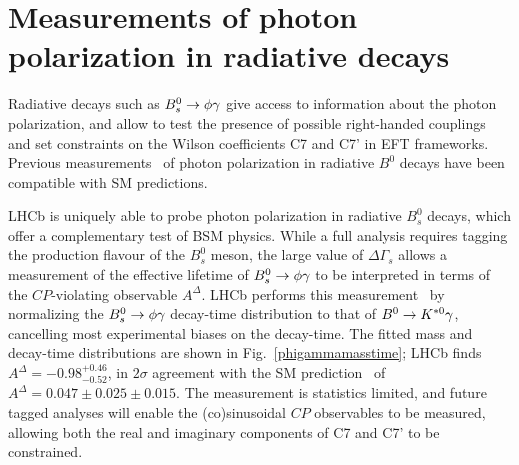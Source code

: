 \section{Measurements of photon polarization in radiative decays}
\label{sec:photpol}
Radiative decays such as ${B}^0_s \rightarrow \phi \gamma$ give access to information
about the photon polarization, and allow to test the presence of possible right-handed
couplings and set constraints on the Wilson coefficients C7 and C7' in EFT frameworks.
Previous measurements~\cite{} of photon polarization in radiative $B^0$ decays
have been compatible with SM predictions. 

LHCb is uniquely able to probe photon polarization in radiative $B^0_s$ decays,
which offer a complementary test of BSM physics. While a full analysis requires
tagging the production flavour of the $B^0_s$ meson, the large value of $\Delta\Gamma_s$
allows a measurement of the effective lifetime of ${B}^0_s \rightarrow \phi \gamma$ to be
interpreted in terms of the $CP$-violating observable $A^\Delta$. LHCb
performs this measurement~\cite{} by normalizing the ${B}^0_s \rightarrow \phi \gamma$ decay-time distribution
to that of ${B}^0 \rightarrow K^{*0} \gamma$, cancelling most experimental biases on the decay-time.
The fitted mass and decay-time distributions are shown in Fig.~\ref{phigammamasstime}; LHCb finds
$A^\Delta = -0.98^{+0.46}_{-0.52}$, in $2\sigma$ agreement with the SM
prediction~\cite{} of $A^\Delta = 0.047 \pm 0.025 \pm 0.015$. The measurement is statistics
limited, and future tagged analyses will enable the (co)sinusoidal $CP$ observables to
be measured, allowing both the real and imaginary components of C7 and C7' to be constrained.

